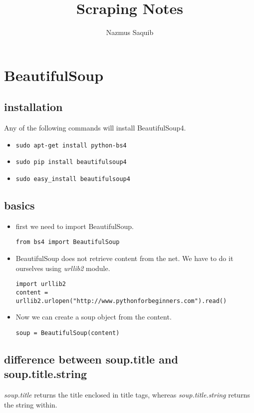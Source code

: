 \documentclass[a4paper, 12pt]{article}
\begin{document}
\title{Scraping Notes}
\author{Nazmus Saquib}

\maketitle
\tableofcontents

\section{BeautifulSoup}

\subsection{installation}
Any of the following commands will install BeautifulSoup4.
\begin{itemize}
\item \verb|sudo apt-get install python-bs4|
\item \verb|sudo pip install beautifulsoup4|
\item \verb|sudo easy_install beautifulsoup4|
\end{itemize}

\subsection{basics}
\begin{itemize}
\item first we need to import BeautifulSoup.
\begin{verbatim}
from bs4 import BeautifulSoup
\end{verbatim}
\item BeautifulSoup does not retrieve content from the net. We have to do it ourselves using \emph{urllib2} module.
\begin{verbatim}
import urllib2
content = urllib2.urlopen("http://www.pythonforbeginners.com").read()
\end{verbatim}
\item Now we can create a soup object from the content.
\begin{verbatim}
soup = BeautifulSoup(content)
\end{verbatim}
\end{itemize}

\subsection{difference between soup.title and soup.title.string}
\emph{soup.title} returns the title enclosed in title tags, whereas \emph{soup.title.string} returns the string within.
\end{document}
